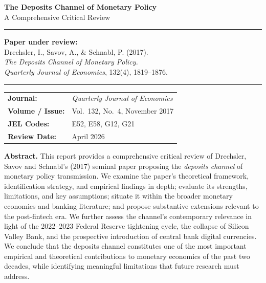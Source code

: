 \documentclass[12pt,a4paper]{article}
\begin{document}
\begin{titlepage}
  \centering
  \vspace*{1.5cm}

  {\Large\bfseries\color{keyblue}
    The Deposits Channel of Monetary Policy}\\[0.5em]
  {\large A Comprehensive Critical Review}

  \vspace{1cm}
  \rule{0.5\linewidth}{0.8pt}
  \vspace{0.8cm}

  {\normalsize
    \textbf{Paper under review:}\\[0.3em]
    Drechsler, I., Savov, A., \& Schnabl, P. (2017).\\
    \textit{The Deposits Channel of Monetary Policy.}\\
    \textit{Quarterly Journal of Economics}, 132(4), 1819--1876.
  }

  \vspace{1.2cm}
  \rule{0.5\linewidth}{0.4pt}
  \vspace{0.8cm}

  {\small
  \begin{tabular}{ll}
    \textbf{Journal:} & \textit{Quarterly Journal of Economics}\\[3pt]
    \textbf{Volume / Issue:} & Vol.\ 132, No.\ 4, November 2017\\[3pt]
    \textbf{JEL Codes:} & E52, E58, G12, G21\\[3pt]
    \textbf{Review Date:} & April 2026\\
  \end{tabular}
  }

  \vfill

  \begin{tcolorbox}[
    colback=keyblue!8, colframe=keyblue,
    width=0.88\linewidth,
    arc=4pt, boxrule=0.6pt,
    fontupper=\small
  ]
  \textbf{Abstract.} This report provides a comprehensive critical review of
  Drechsler, Savov and Schnabl's (2017) seminal paper proposing the
  \emph{deposits channel} of monetary policy transmission. We examine the
  paper's theoretical framework, identification strategy, and empirical
  findings in depth; evaluate its strengths, limitations, and key
  assumptions; situate it within the broader monetary economics and banking
  literature; and propose substantive extensions relevant to the post-fintech
  era. We further assess the channel's contemporary relevance in light of the
  2022--2023 Federal Reserve tightening cycle, the collapse of Silicon Valley
  Bank, and the prospective introduction of central bank digital currencies.
  We conclude that the deposits channel constitutes one of the most important
  empirical and theoretical contributions to monetary economics of the past
  two decades, while identifying meaningful limitations that future research
  must address.
  \end{tcolorbox}

  \vspace{1cm}
\end{titlepage}
\end{document}
